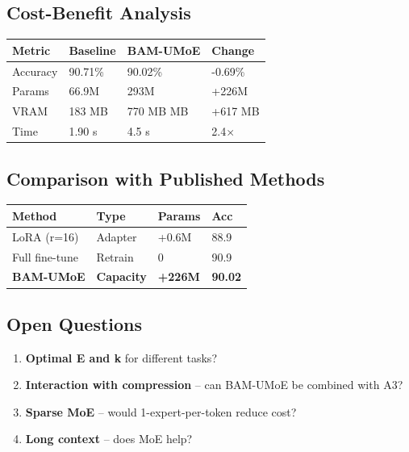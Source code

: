 \subsection{Cost-Benefit Analysis}

\begin{table}[H]
\centering
\small
\begin{tabular}{llll}
\toprule
\textbf{Metric} & \textbf{Baseline} & \textbf{BAM-UMoE} & \textbf{Change} \\
\midrule
Accuracy & 90.71\% & 90.02\% & -0.69\% \\
Params & 66.9M & 293M & +226M \\
VRAM & 183 MB & 770 MB MB & +617 MB \\
Time & 1.90 s & 4.5 s & 2.4$\times$ \\
\bottomrule
\end{tabular}
\end{table}

\subsection{Comparison with Published Methods}

\begin{table}[H]
\centering
\small
\begin{tabular}{llll}
\toprule
\textbf{Method} & \textbf{Type} & \textbf{Params} & \textbf{Acc} \\
\midrule
LoRA (r=16) & Adapter & +0.6M & 88.9 \\
Full fine-tune & Retrain & 0 & 90.9 \\
\textbf{BAM-UMoE} & \textbf{Capacity} & \textbf{+226M} & \textbf{90.02} \\
\bottomrule
\end{tabular}
\end{table}

\subsection{Open Questions}

\begin{enumerate}
\item \textbf{Optimal E and k} for different tasks?
\item \textbf{Interaction with compression} -- can BAM-UMoE be combined with A3?
\item \textbf{Sparse MoE} -- would 1-expert-per-token reduce cost?
\item \textbf{Long context} -- does MoE help?

\end{enumerate}
